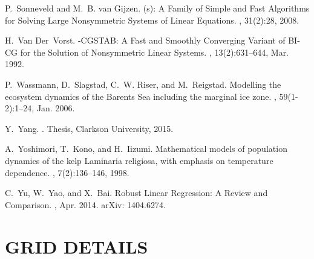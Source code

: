 \documentclass[ms,cpyr,lof,lot]{uathesis}
\begin{document}
\begin{thebibliography}{10}
P.~Sonneveld and M.~B. van Gijzen.
(s): {A} {Family} of {Simple} and {Fast} {Algorithms} for
  {Solving} {Large} {Nonsymmetric} {Systems} of {Linear} {Equations}.
, 31(2):28,
  2008.

H.~Van Der~Vorst.
-{CGSTAB}: {A} {Fast} and {Smoothly} {Converging} {Variant} of
  {BI}-{CG} for the {Solution} of {Nonsymmetric} {Linear} {Systems}.
,
  13(2):631--644, Mar. 1992.

P.~Wassmann, D.~Slagstad, C.~W. Riser, and M.~Reigstad.
\newblock Modelling the ecosystem dynamics of the {Barents} {Sea} including the
  marginal ice zone.
, 59(1-2):1--24, Jan. 2006.

Y.~Yang.
.
 {Thesis}, Clarkson University, 2015.

A.~Yoshimori, T.~Kono, and H.~Iizumi.
\newblock Mathematical models of population dynamics of the kelp {Laminaria}
  religiosa, with emphasis on temperature dependence.
, 7(2):136--146, 1998.

C.~Yu, W.~Yao, and X.~Bai.
\newblock Robust {Linear} {Regression}: {A} {Review} and {Comparison}.
, Apr. 2014.
\newblock arXiv: 1404.6274.

\end{thebibliography}

\chapter{GRID DETAILS}
\label{chap:grid_details}
\end{document}
